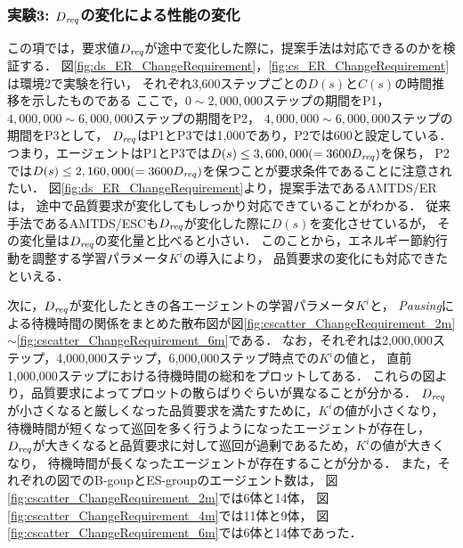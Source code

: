 \documentclass[12pt,a4j,twoside]{jarticle}
\def\Dreq{{D_{\it req}}}
\begin{document}
  
  \subsubsection{実験3: $\Dreq$の変化による性能の変化}\label{ex:ER3}
  この項では，要求値$\Dreq$が途中で変化した際に，提案手法は対応できるのかを検証する．
  図\ref{fig:ds_ER_ChangeRequirement}，\ref{fig:cs_ER_ChangeRequirement}は環境2で実験を行い，
  それぞれ3,600ステップごとの$D(s)$と$C(s)$の時間推移を示したものである
  ここで，$0 \sim 2,000,000$ステップの期間をP1，$4,000,000 \sim 6,000,000$ステップの期間をP2，
  $4,000,000 \sim 6,000,000$ステップの期間をP3として，
  $\Dreq$はP1とP3では1,000であり，P2では600と設定している．
  つまり，エージェントはP1とP3では$D(s) \leq 3,600,000 (= 3600\Dreq)$を保ち，
  P2では$D(s) \leq 2,160,000 (= 3600\Dreq)$を保つことが要求条件であることに注意されたい．
  図\ref{fig:ds_ER_ChangeRequirement}より，提案手法であるAMTDS/ERは，
  途中で品質要求が変化してもしっかり対応できていることがわかる．
  従来手法であるAMTDS/ESCも$\Dreq$が変化した際に$D(s)$を変化させているが，
  その変化量は$\Dreq$の変化量と比べると小さい．
  このことから，エネルギー節約行動を調整する学習パラメータ$K^i$の導入により，
  品質要求の変化にも対応できたといえる．
  \par

  次に，$\Dreq$が変化したときの各エージェントの学習パラメータ$K^i$と，
  {\em Pausing}による待機時間の関係をまとめた散布図が図\ref{fig:cscatter_ChangeRequirement_2m}
  $\sim$\ref{fig:cscatter_ChangeRequirement_6m}である．
  なお，それぞれは2,000,000ステップ，4,000,000ステップ，6,000,000ステップ時点での$K^i$の値と，
  直前1,000,000ステップにおける待機時間の総和をプロットしてある．
  これらの図より，品質要求によってプロットの散らばりぐらいが異なることが分かる．
  $\Dreq$が小さくなると厳しくなった品質要求を満たすために，$K^i$の値が小さくなり，
  待機時間が短くなって巡回を多く行うようになったエージェントが存在し，
  $\Dreq$が大きくなると品質要求に対して巡回が過剰であるため，$K^i$の値が大きくなり，
  待機時間が長くなったエージェントが存在することが分かる．
  また，それぞれの図でのB-goupとES-groupのエージェント数は，
  図\ref{fig:cscatter_ChangeRequirement_2m}では6体と14体，
  図\ref{fig:cscatter_ChangeRequirement_4m}では11体と9体，
  図\ref{fig:cscatter_ChangeRequirement_6m}では6体と14体であった．
  \par
\end{document}
